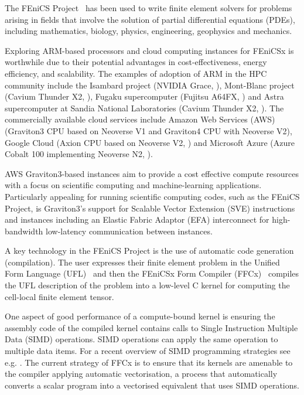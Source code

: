The FEniCS Project~\citep{alnaes2015fenics,baratta_dolfinx_2023} has been used
to write finite element solvers for problems arising in fields that involve the
solution of partial differential equations (PDEs), including mathematics,
biology, physics, engineering, geophysics and mechanics.

Exploring ARM-based processors and cloud computing instances for FEniCSx is
worthwhile due to their potential advantages in cost-effectiveness, energy
efficiency, and scalability. The examples of adoption of ARM in the HPC
community include the Isambard project (NVIDIA Grace, \citep{isambard}),
Mont-Blanc project (Cavium Thunder X2, \citep{Rajovic2016}), Fugaku
supercomputer (Fujitsu A64FX, \citep{fugaku}) and Astra supercomputer at Sandia
National Laboratories (Cavium Thunder X2, \citep{astra}). The commercially
available cloud services include Amazon Web Services (AWS) (Graviton3 CPU based
on Neoverse V1 and Graviton4 CPU with Neoverse V2), Google Cloud (Axion CPU
based on Neoverse V2, \citep{google_arm_compute}) and Microsoft Azure (Azure
Cobalt 100 implementing Neoverse N2, \citep{microsoft_azure}).

AWS Graviton3-based instances aim to provide a cost effective compute resources
with a focus on scientific computing and machine-learning applications.
Particularly appealing for running scientific computing codes, such as the
FEniCS Project, is Graviton3's support for Scalable Vector Extension (SVE)
instructions and instances including an Elastic Fabric Adaptor (EFA)
interconnect for high-bandwidth low-latency communication between instances.

A key technology in the FEniCS Project is the use of automatic code generation
(compilation). The user expresses their finite element problem in the Unified
Form Language (UFL)~\citep{alnaes_unified_2014} and then the FEniCSx Form
Compiler (FFCx)~\citep{kirby_compiler_2006} compiles the UFL description of the
problem into a low-level C kernel for computing the cell-local finite element
tensor.

One aspect of good performance of a compute-bound kernel is ensuring the assembly
code of the compiled kernel contains calls to Single Instruction Multiple Data
(SIMD) operations. SIMD operations can apply the same operation to multiple data
items. For a recent overview of SIMD programming strategies see e.g.
\citep{rocke_evaluation_2023}. The current strategy of FFCx is to ensure that
its kernels are amenable to the compiler applying automatic vectorisation, a
process that automatically converts a scalar program into a vectorised
equivalent that uses SIMD operations.
 
